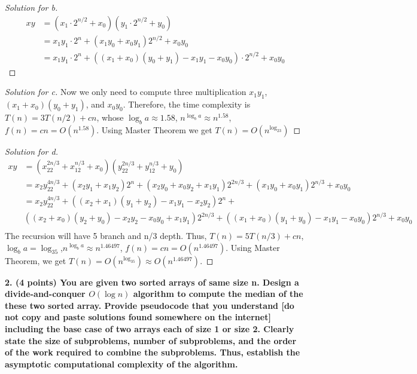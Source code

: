 \documentclass[12pt]{article}
\begin{document}
\begin{proof}[Solution for b]
	\begin{align*}
		xy&=(x_1\cdot2^{n/2}+x_0)(y_1\cdot2^{n/2}+y_0)\\
		&=x_1y_1\cdot2^{n}+(x_1y_0+x_0y_1)2^{n/2}+x_0y_0\\
		&=x_1y_1\cdot2^{n}+((x_1+x_0)(y_0+y_1)-x_1y_1-x_0y_0)\cdot2^{n/2}+x_0y_0
	\end{align*}
	
\end{proof}

\begin{proof}[Solution for c]
	Now we only need to compute three multiplication $x_1y_1$, $(x_1+x_0)(y_0+y_1)$, and $x_0y_0$. Therefore, the time complexity is $T(n)=3T(n/2)+cn$, whose $\log_ba\approx1.58$, $n^{\log_ba}\approx n^{1.58}$, $f(n)=cn=O(n^{1.58})$. Using Master Theorem we get $T(n)=O(n^{\log_23})$
\end{proof}

\begin{proof}[Solution for d]
	\begin{align*}
		xy&=(x_22^{2n/3}+x_12^{n/3}+x_0)(y_22^{2n/3}+y_12^{n/3}+y_0)\\
		&=x_2y_22^{4n/3}+(x_2y_1+x_1y_2)2^{n}+(x_2y_0+x_0y_2+x_1y_1)2^{2n/3}+(x_1y_0+x_0y_1)2^{n/3}+x_0y_0\\
		&=x_2y_22^{4n/3}+((x_2+x_1)(y_1+y_2)-x_1y_1-x_2y_2)2^n+\\
		&((x_2+x_0)(y_2+y_0)-x_2y_2-x_0y_0+x_1y_1)2^{2n/3}+((x_1+x_0)(y_1+y_0)-x_1y_1-x_0y_0)2^{n/3}+x_0y_0\\
	\end{align*}
	The recursion will have 5 branch and n/3 depth. Thus, $T(n)=5T(n/3)+cn$, $\log_ba=\log_35$,$n^{\log_ba}\approx n^{1.46497}$, $f(n)=cn=O(n^{1.46497})$. Using Master Theorem, we get $T(n)=O(n^{\log_35})\approx O(n^{1.46497})$.
\end{proof}
\textbf{2. (4 points) You are given two sorted arrays of same size n. Design a divide-and-conquer $O(\log n)$ algorithm to compute the median of the these two sorted array. Provide pseudocode that you understand [do not copy and paste solutions found somewhere on the internet] including the base case of two arrays each of size 1 or size 2. Clearly state the size of subproblems, number of subproblems, and the order of the work required to combine the subproblems. Thus, establish the asymptotic computational complexity of the algorithm.}
\end{document}
